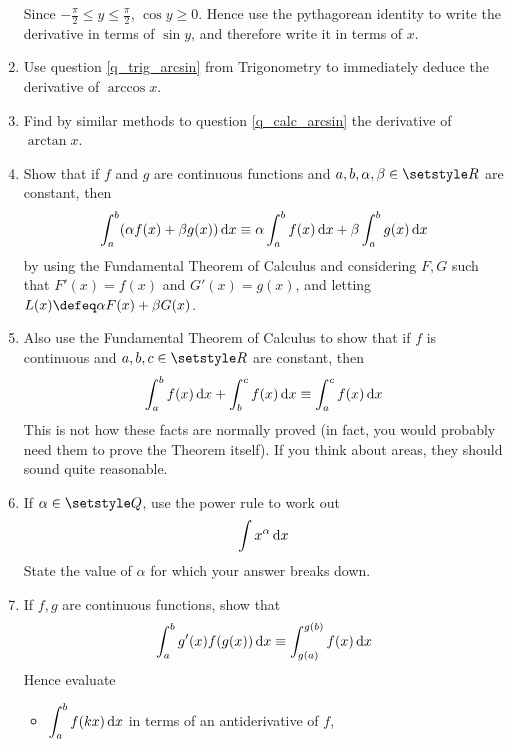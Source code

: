 \begin{enumerate}
  Since \(-\frac \pi 2 \le y \le \frac \pi 2\), \(\cos y \ge 0\). Hence use the
  pythagorean identity to write the derivative in terms of \(\sin y\), and
  therefore write it in terms of \(x\).
 \item
  Use question \ref{q_trig_arcsin} from Trigonometry to immediately deduce the
  derivative of \(\arccos x\).
 \item
  Find by similar methods to question \ref{q_calc_arcsin} the derivative of
  \(\arctan x\).
 \item
  Show that if \(f\) and \(g\) are continuous functions and
  \(a, b, \alpha, \beta \in \Reals\) are constant, then
  \begin{equation*}
   \integ[a]<b>{(\alpha f(x) + \beta g(x))}{x} \equiv
   \alpha \integ[a]<b>{f(x)}{x} +
   \beta  \integ[a]<b>{g(x)}{x}
  \end{equation*}
  by using the Fundamental Theorem of Calculus and considering \(F, G\) such
  that \(F'(x) = f(x)\) and \(G'(x) = g(x)\), and letting
  \(L(x) \defeq \alpha F(x) + \beta G(x)\).
 \item
  Also use the Fundamental Theorem of Calculus to show that if \(f\) is
  continuous and \(a, b, c \in \Reals\) are constant, then
  \begin{equation*}
   \integ[a]<b>{f(x)}{x} + \integ[b]<c>{f(x)}{x} \equiv
   \integ[a]<c>{f(x)}{x}
  \end{equation*}
  This is not how these facts are normally proved (in fact, you would probably
  need them to prove the Theorem itself). If you think about areas, they should
  sound quite reasonable.
 \item \label{q_calc_int_pwr}
  If \(\alpha \in \Rationals\), use the power rule to work out
  \begin{equation*}
   \integ{x^\alpha}{x}
  \end{equation*}
  State the value of \(\alpha\) for which your answer breaks down.
 \item
  If \(f, g\) are continuous functions, show that
  \begin{equation*}
   \integ[a]<b>{g'(x) f(g(x))}{x} \equiv
   \integ[g(a)]<g(b)>{f(x)}{x}
  \end{equation*}
  Hence evaluate
  \begin{itemize}
   \item \(\displaystyle
    \integ[a]<b>{f(kx)}{x}
    \) in terms of an antiderivative of \(f\),


\end{itemize}
\end{enumerate}
